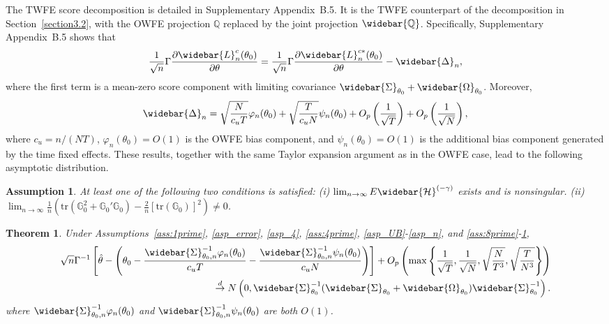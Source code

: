 \documentclass[11pt,a4paper]{article}
\newtheorem{theorem}{Theorem}
\newtheorem{passumption}{Assumption}
\begin{document}
The TWFE score decomposition is detailed in Supplementary Appendix~B.5. It is the TWFE counterpart of the decomposition in
Section~\ref{section3.2}, with the OWFE projection \(\mathbb Q\) replaced by the joint
projection \(\widebar{\mathbb Q}\). Specifically, Supplementary
Appendix~B.5 shows that
\[\frac{1}{\sqrt n}\Gamma\frac{\partial\widebar{L}_n^c(\theta_0)}{\partial\theta} = \frac{1}{\sqrt n}\Gamma\frac{\partial\widebar{L}_n^{c*}(\theta_0)}{\partial\theta} -\widebar{\Delta}_n,\] 
where the first term is a mean-zero score component with
limiting covariance
\(\widebar{\Sigma}_{\theta_0}+\widebar{\Omega}_{\theta_0}\). Moreover,
\[ \widebar{\Delta}_n = \sqrt{\frac{N}{c_uT}}\varphi_n(\theta_0) + \sqrt{\frac{T}{c_uN}}\psi_n(\theta_0) + O_p\left(\frac{1}{\sqrt T}\right) + O_p\left(\frac{1}{\sqrt N}\right), \]
where \(c_u=n/(NT)\), \(\varphi_n(\theta_0)=O(1)\) is the OWFE bias
component, and \(\psi_n(\theta_0)=O(1)\) is the additional bias component
generated by the time fixed effects. These results, together with the same
Taylor expansion argument as in the OWFE case, lead to the following asymptotic distribution.



\begin{passumption}\label{asp_nonsingularity'}
At least one of the following two conditions is satisfied:
(i) $\lim_{n\rightarrow\infty}E\widebar{\mathcal{H}}^{(-\gamma)}$ exists and is nonsingular.
(ii) $\lim_{n\rightarrow\infty}\frac{1}{n}\left(\mathrm{tr}(\mathbb{G}_0^2+\mathbb{G}_0'\mathbb{G}_0)-\frac{2}{n}\left[\mathrm{tr}(\mathbb{G}_0)\right]^2\right)\neq0$.
\end{passumption}

\begin{theorem}\label{Normality_twfe}
Under Assumptions~\ref{ass:1prime}, \ref{asp_error}, \ref{asp_4}, \ref{ass:4prime}, \ref{asp_UB}-\ref{asp_n}, and \ref{ass:8prime}-\ref{asp_nonsingularity'},
\begin{align}
\sqrt{n}\Gamma^{-1}
\left[
\hat{\theta}
-
\left(
\theta_0
-
\frac{\widebar{\Sigma}_{\theta_0,n}^{-1}\varphi_n(\theta_0)}{c_uT}
-
\frac{\widebar{\Sigma}_{\theta_0,n}^{-1}\psi_n(\theta_0)}{c_uN}
\right)
\right]
+O_p\left(
\max\left\{
\frac{1}{\sqrt{T}},
\frac{1}{\sqrt{N}},
\sqrt{\frac{N}{T^3}},
\sqrt{\frac{T}{N^3}}
\right\}
\right)\nonumber\\
\overset{d}{\rightarrow}
N\left(
0,
\widebar{\Sigma}_{\theta_0}^{-1}
(\widebar{\Sigma}_{\theta_0}+\widebar{\Omega}_{\theta_0})
\widebar{\Sigma}_{\theta_0}^{-1}
\right).
\label{eq_Normality_twfe}
\end{align}
where $\widebar{\Sigma}_{\theta_0,n}^{-1}\varphi_n(\theta_0)$ and $\widebar{\Sigma}_{\theta_0,n}^{-1}\psi_n(\theta_0)$ are both $O(1)$.
\end{theorem}
\end{document}
